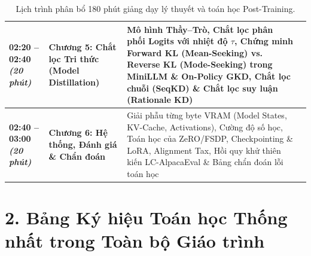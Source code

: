 \documentclass[11pt,a4paper,oneside]{report}
\theoremstyle{plain}
\theoremstyle{definition}
\theoremstyle{remark}
\begin{document}
\begin{table}[h!]
\begin{tabularx}{\textwidth}{>{\bfseries}p{2.3cm} >{\bfseries}p{3.2cm} X p{3.8cm}}
\midrule
02:20 -- 02:40 \newline \textit{(20 phút)} & Chương 5: \newline Chắt lọc Tri thức (Model Distillation) & Mô hình Thầy--Trò, Chắt lọc phân phối Logits với nhiệt độ $\tau$, Chứng minh Forward KL (Mean-Seeking) vs. Reverse KL (Mode-Seeking) trong MiniLLM \& On-Policy GKD, Chắt lọc chuỗi (SeqKD) \& Chắt lọc suy luận (Rationale KD) & \citet{hinton2015distilling, kim2016sequence, hsieh2023distilling, gu2024minillm, agarwal2024onpolicy, deepseek2025r1} \\
\midrule
02:40 -- 03:00 \newline \textit{(20 phút)} & Chương 6: \newline Hệ thống, Đánh giá \& Chẩn đoán & Giải phẫu từng byte VRAM (Model States, KV-Cache, Activations), Cường độ số học, Toán học của ZeRO/FSDP, Checkpointing \& LoRA, Alignment Tax, Hồi quy khử thiên kiến LC-AlpacaEval \& Bảng chẩn đoán lỗi toán học & \citet{rajbhandari2020zero, hu2022lora, dettmers2023qlora, sheng2024hybridflow, zheng2023judging, dubois2024length, chiang2024chatbot} \\
\bottomrule
\end{tabularx}
\caption{Lịch trình phân bổ 180 phút giảng dạy lý thuyết và toán học Post-Training.}
\end{table}

\section*{2. Bảng Ký hiệu Toán học Thống nhất trong Toàn bộ Giáo trình}
\end{document}
